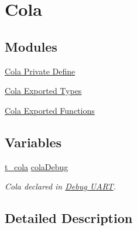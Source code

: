 \hypertarget{group___cola}{}\section{Cola}
\label{group___cola}
\subsection*{Modules}
\begin{DoxyCompactItemize}
\item 
\hyperlink{group___cola___private___define}{Cola Private Define}
\item 
\hyperlink{group___cola___exported___types}{Cola Exported Types}
\item 
\hyperlink{group___cola___exported___functions}{Cola Exported Functions}
\end{DoxyCompactItemize}
\subsection*{Variables}
\begin{DoxyCompactItemize}
\item 
\hyperlink{structt__cola}{t\+\_\+cola} \hyperlink{group___cola_ga314fd637d927bd6a2551e119de623aa5}{cola\+Debug}\hypertarget{group___cola_ga314fd637d927bd6a2551e119de623aa5}{}\label{group___cola_ga314fd637d927bd6a2551e119de623aa5}

\begin{DoxyCompactList}\small\item\em Cola declared in \hyperlink{group___debug___uart}{Debug U\+A\+RT}. \end{DoxyCompactList}\end{DoxyCompactItemize}


\subsection{Detailed Description}
